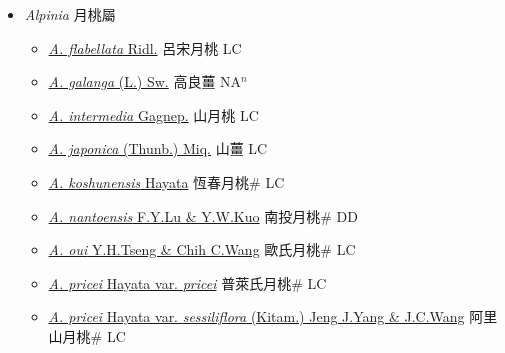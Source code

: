 
  \begin{itemize}
 \item[] \textit{Alpinia} 月桃屬
                    
  \begin{itemize}
        \item[] \href{http://www.theplantlist.org/tpl1.1/search?q=Alpinia+flabellata}{\textit{A. flabellata} Ridl.}   呂宋月桃 LC
        \item[] \href{http://www.theplantlist.org/tpl1.1/search?q=Alpinia+galanga}{\textit{A. galanga} (L.) Sw.}   高良薑 NA$^n$
        \item[] \href{http://www.theplantlist.org/tpl1.1/search?q=Alpinia+intermedia}{\textit{A. intermedia} Gagnep.}   山月桃 LC
        \item[] \href{http://www.theplantlist.org/tpl1.1/search?q=Alpinia+japonica}{\textit{A. japonica} (Thunb.) Miq.}   山薑 LC
        \item[] \href{http://www.theplantlist.org/tpl1.1/search?q=Alpinia+koshunensis}{\textit{A. koshunensis} Hayata}   恆春月桃\# LC
        \item[] \href{http://www.theplantlist.org/tpl1.1/search?q=Alpinia+nantoensis}{\textit{A. nantoensis} F.Y.Lu \& Y.W.Kuo}   南投月桃\# DD
        \item[] \href{http://www.theplantlist.org/tpl1.1/search?q=Alpinia+oui}{\textit{A. oui} Y.H.Tseng \& Chih C.Wang}   歐氏月桃\# LC
        \item[] \href{http://www.theplantlist.org/tpl1.1/search?q=Alpinia+pricei+var.+pricei}{\textit{A. pricei} Hayata var. \textit{pricei}}   普萊氏月桃\# LC
        \item[] \href{http://www.theplantlist.org/tpl1.1/search?q=Alpinia+pricei+var.+sessiliflora}{\textit{A. pricei} Hayata var. \textit{sessiliflora} (Kitam.) Jeng J.Yang \& J.C.Wang}   阿里山月桃\# LC

\end{itemize}
\end{itemize}
